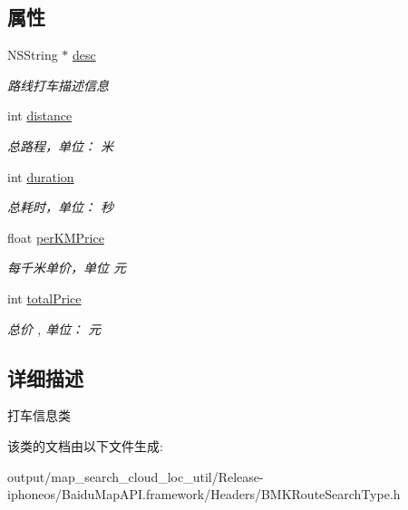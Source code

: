 \subsection*{属性}
\begin{DoxyCompactItemize}
\item 
\hypertarget{interface_b_m_k_taxi_info_a3f7635255548ce4a6baa13c6badc048d}{}N\+S\+String $\ast$ \hyperlink{interface_b_m_k_taxi_info_a3f7635255548ce4a6baa13c6badc048d}{desc}\label{interface_b_m_k_taxi_info_a3f7635255548ce4a6baa13c6badc048d}

\begin{DoxyCompactList}\small\item\em 路线打车描述信息 \end{DoxyCompactList}\item 
\hypertarget{interface_b_m_k_taxi_info_a0f40d0e207438cb15746b8f5c15dd0c7}{}int \hyperlink{interface_b_m_k_taxi_info_a0f40d0e207438cb15746b8f5c15dd0c7}{distance}\label{interface_b_m_k_taxi_info_a0f40d0e207438cb15746b8f5c15dd0c7}

\begin{DoxyCompactList}\small\item\em 总路程，单位： 米 \end{DoxyCompactList}\item 
\hypertarget{interface_b_m_k_taxi_info_af327eba903b8dd7873f3edffbc329dcc}{}int \hyperlink{interface_b_m_k_taxi_info_af327eba903b8dd7873f3edffbc329dcc}{duration}\label{interface_b_m_k_taxi_info_af327eba903b8dd7873f3edffbc329dcc}

\begin{DoxyCompactList}\small\item\em 总耗时，单位： 秒 \end{DoxyCompactList}\item 
\hypertarget{interface_b_m_k_taxi_info_a64631e889c0a36ccd3fa8c1596a25544}{}float \hyperlink{interface_b_m_k_taxi_info_a64631e889c0a36ccd3fa8c1596a25544}{per\+K\+M\+Price}\label{interface_b_m_k_taxi_info_a64631e889c0a36ccd3fa8c1596a25544}

\begin{DoxyCompactList}\small\item\em 每千米单价，单位 元 \end{DoxyCompactList}\item 
\hypertarget{interface_b_m_k_taxi_info_a4787f76e00a7c1a9cda736bfb9d6bd5e}{}int \hyperlink{interface_b_m_k_taxi_info_a4787f76e00a7c1a9cda736bfb9d6bd5e}{total\+Price}\label{interface_b_m_k_taxi_info_a4787f76e00a7c1a9cda736bfb9d6bd5e}

\begin{DoxyCompactList}\small\item\em 总价 , 单位： 元 \end{DoxyCompactList}\end{DoxyCompactItemize}


\subsection{详细描述}
打车信息类 

该类的文档由以下文件生成\+:\begin{DoxyCompactItemize}
\item 
output/map\+\_\+search\+\_\+cloud\+\_\+loc\+\_\+util/\+Release-\/iphoneos/\+Baidu\+Map\+A\+P\+I.\+framework/\+Headers/B\+M\+K\+Route\+Search\+Type.\+h\end{DoxyCompactItemize}
